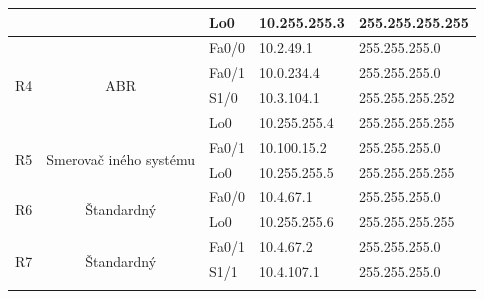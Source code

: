 \documentclass[12pt,twoside,a4paper]{article}
\begin{document}
\begin{table}[!htb]
\begin{tabular}{|c|c|l|l|l|}
                     &                                         & Lo0                                     & 10.255.255.3                            & 255.255.255.255                     \\ \hline
\multirow{4}{*}{R4}  & \multirow{4}{*}{ABR}                    & Fa0/0                                   & 10.2.49.1                               & 255.255.255.0                       \\ \cline{3-5} 
                     &                                         & Fa0/1                                   & 10.0.234.4                              & 255.255.255.0                       \\ \cline{3-5} 
                     &                                         & S1/0                                    & 10.3.104.1                              & 255.255.255.252                     \\ \cline{3-5} 
                     &                                         & Lo0                                     & 10.255.255.4                            & 255.255.255.255                     \\ \hline
\multirow{2}{*}{R5}  & \multirow{2}{*}{Smerovač iného systému} & Fa0/1                                   & 10.100.15.2                             & 255.255.255.0                       \\ \cline{3-5} 
                     &                                         & Lo0                                     & 10.255.255.5                            & 255.255.255.255                     \\ \hline
\multirow{2}{*}{R6}  & \multirow{2}{*}{Štandardný}             & Fa0/0                                   & 10.4.67.1                               & 255.255.255.0                       \\ \cline{3-5} 
                     &                                         & Lo0                                     & 10.255.255.6                            & 255.255.255.255                     \\ \hline
\multirow{3}{*}{R7}  & \multirow{3}{*}{Štandardný}             & Fa0/1                                   & 10.4.67.2                               & 255.255.255.0                       \\ \cline{3-5} 
                     &                                         & S1/1                                    & 10.4.107.1                              & 255.255.255.0                       \\ \cline{3-5} 

\end{tabular}
\end{table}
\end{document}
